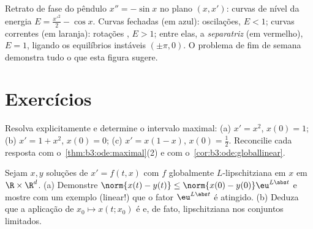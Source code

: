 \begin{omfigure}

{\small Retrato de fase do pêndulo $x'' = -\sin x$ no plano $(x, x')$: curvas de nível
da energia $E = \frac{x'^2}2
- \cos x$. Curvas fechadas (em azul): oscilações, $E < 1$;
curvas correntes (em laranja): rotações , $E > 1$; entre
elas, a \emph{separatriz} (em vermelho), $E = 1$, ligando os
equilíbrios instáveis $(\pm\pi, 0)$. O problema de fim de semana demonstra tudo
o que esta figura sugere.}
\end{omfigure}

\section{Exercícios}

\begin{exercise}[$\star$]\label{exo:b3:ode:1}
Resolva explicitamente e determine o intervalo maximal:
(a) $x' = x^2$, $x(0) = 1$; (b) $x' = 1 + x^2$, $x(0) = 0$; (c) $x' = x(1-x)$, $x(0) = \frac12$. Reconcilie cada
resposta com o~\cref{thm:b3:ode:maximal}(2) e com o~\cref{cor:b3:ode:globallinear}.
\end{exercise}

\begin{exercise}[$\star$]\label{exo:b3:ode:2}
Sejam $x, y$ soluções de $x' = f(t,x)$ com $f$ globalmente
$L$-lipschitziana em $x$ em $\R\times\R^d$.
(a) Demonstre $\norm{x(t) - y(t)} \leq \norm{x(0) -
y(0)}\eu^{L\abs t}$ e mostre com um exemplo (linear!) que o fator $\eu^{L\abs t}$
é atingido.
(b) Deduza que a aplicação de  $x_0 \mapsto x(t; x_0)$ é  e, de fato,
lipschitziana nos conjuntos limitados.
\end{exercise}

